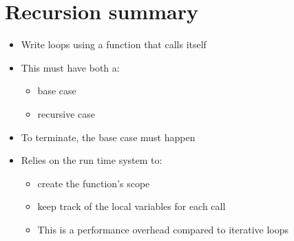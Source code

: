 \documentclass{article}
\begin{document}
\section{Recursion summary}
\begin{itemize}
\item Write loops using a function that calls itself
\item This must have both a:
\begin{itemize}
\item base case
\item recursive case
\end{itemize}
\item To terminate, the base case must happen

\item Relies on the run time system to:
\begin{itemize}
\item create the function's scope
\item keep track of the local variables for each call
\item This is a performance overhead compared to iterative loops
\end{itemize}
\end{itemize}
\end{document}
